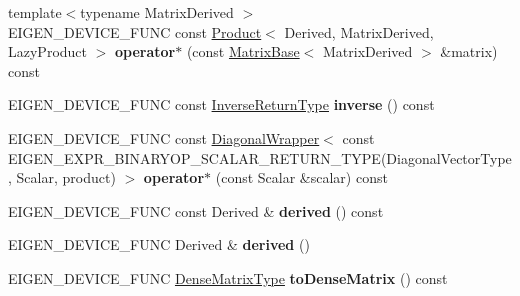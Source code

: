 \begin{DoxyCompactItemize}
\mbox{\label{class_eigen_1_1_diagonal_base_a311acf89512b3aab2a846175f2e94456}} 
{\footnotesize template$<$typename Matrix\+Derived $>$ }\\E\+I\+G\+E\+N\+\_\+\+D\+E\+V\+I\+C\+E\+\_\+\+F\+U\+NC const \hyperlink{group___core___module_class_eigen_1_1_product}{Product}$<$ Derived, Matrix\+Derived, Lazy\+Product $>$ {\bfseries operator$\ast$} (const \hyperlink{group___core___module_class_eigen_1_1_matrix_base}{Matrix\+Base}$<$ Matrix\+Derived $>$ \&matrix) const
\item 
\mbox{\label{class_eigen_1_1_diagonal_base_a608e40d7fc3d4effb3851e77d76f586b}} 
E\+I\+G\+E\+N\+\_\+\+D\+E\+V\+I\+C\+E\+\_\+\+F\+U\+NC const \hyperlink{group___core___module_class_eigen_1_1_diagonal_wrapper}{Inverse\+Return\+Type} {\bfseries inverse} () const
\item 
\mbox{\label{class_eigen_1_1_diagonal_base_ae1b68e95250f656e9eb0ac746f8ba529}} 
E\+I\+G\+E\+N\+\_\+\+D\+E\+V\+I\+C\+E\+\_\+\+F\+U\+NC const \hyperlink{group___core___module_class_eigen_1_1_diagonal_wrapper}{Diagonal\+Wrapper}$<$ const E\+I\+G\+E\+N\+\_\+\+E\+X\+P\+R\+\_\+\+B\+I\+N\+A\+R\+Y\+O\+P\+\_\+\+S\+C\+A\+L\+A\+R\+\_\+\+R\+E\+T\+U\+R\+N\+\_\+\+T\+Y\+PE(Diagonal\+Vector\+Type, Scalar, product) $>$ {\bfseries operator$\ast$} (const Scalar \&scalar) const
\item 
\mbox{\label{class_eigen_1_1_diagonal_base_a3c99bfd342f96df1e795cfa82672686e}} 
E\+I\+G\+E\+N\+\_\+\+D\+E\+V\+I\+C\+E\+\_\+\+F\+U\+NC const Derived \& {\bfseries derived} () const
\item 
\mbox{\label{class_eigen_1_1_diagonal_base_a7469600c500a349e1b728ba86eb9b267}} 
E\+I\+G\+E\+N\+\_\+\+D\+E\+V\+I\+C\+E\+\_\+\+F\+U\+NC Derived \& {\bfseries derived} ()
\item 
\mbox{\label{class_eigen_1_1_diagonal_base_a578b87659abce86f82c21e012577f64a}} 
E\+I\+G\+E\+N\+\_\+\+D\+E\+V\+I\+C\+E\+\_\+\+F\+U\+NC \hyperlink{group___core___module_class_eigen_1_1_matrix}{Dense\+Matrix\+Type} {\bfseries to\+Dense\+Matrix} () const
\item 
\mbox{\label{class_eigen_1_1_diagonal_base_a98d954efacff5c32f7acbb1f51050673}} 

\end{DoxyCompactItemize}
